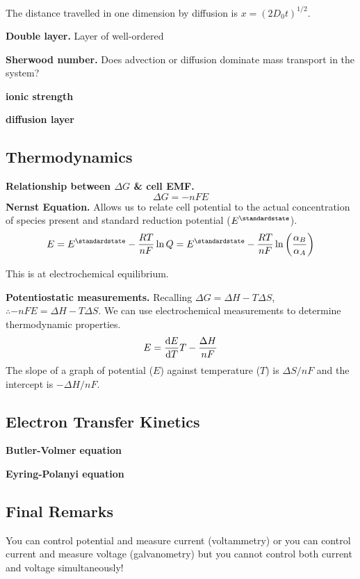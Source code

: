 The distance travelled in one dimension by diffusion is $x = (2D_0t)^{1/2}$.

\textbf{Double layer.} Layer of well-ordered

\textbf{Sherwood number.} Does advection or diffusion dominate mass transport in the system?

\textbf{ionic strength}

\textbf{diffusion layer}

\subsection*{Thermodynamics}
\textbf{Relationship between $\Delta G$ \& cell EMF.}
\begin{equation*}
    \Delta G = -nFE
\end{equation*}
\textbf{Nernst Equation.} Allows us to relate cell potential to the actual concentration of species
present and standard reduction potential ($E^\standardstate$).
\begin{equation*}
    E = E^\standardstate - \frac{RT}{nF} \ln Q = E^\standardstate - \frac{RT}{nF} \ln\left(\frac{\alpha_B}{\alpha_A}\right)
\end{equation*}

This is at electrochemical equilibrium.



\textbf{Potentiostatic measurements.} Recalling $\Delta G = \Delta H - T \Delta S$, 
$ \therefore - nFE = \Delta H - T \Delta S$. We can use electrochemical measurements to determine
thermodynamic properties.
\begin{equation*}
    E = \odv{E}{T}T - \frac{\Delta H}{nF}
\end{equation*} The slope of a graph of potential ($E$) against temperature ($T$)
is $\Delta S / nF$ and the intercept is $- \Delta H / nF$.

\subsection*{Electron Transfer Kinetics}

\textbf{Butler-Volmer equation}

\textbf{Eyring-Polanyi equation}

\subsection*{Final Remarks}
You can control potential and measure current (voltammetry) or you can control current
and measure voltage (galvanometry) but you cannot control both current and voltage
simultaneously!

